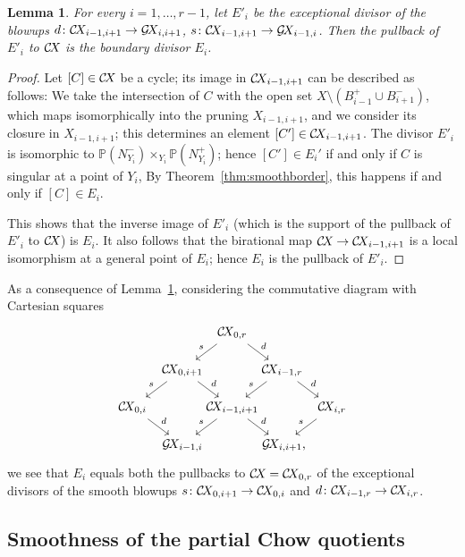 \documentclass[10pt,a4paper]{article}
\numberwithin{equation}{section}
\newtheorem{lemma}[theorem]{Lemma}
\theoremstyle{definition}
\theoremstyle{remark}
\def\P{{\mathbb P}}
\def\prul{s}
\def\prur{d}
\def\GX{\mathcal{G}\!X\hspace{-0.5pt}}
\def\CX{\mathcal{C}\!X\hspace{-0.5pt}}
\begin{document}
\begin{lemma}\label{lem:Eiblowup}
For every $i = 1, \dots, r-1$, let $E'_i$ be the exceptional divisor of the blowups
$\prur\colon\CX_{i-1,i+1}\to \GX_{i,i+1}$, $\prul\colon\CX_{i-1,i+1}\to \GX_{i-1,i}$. Then the pullback of $E'_i$ to $\CX$ is the boundary divisor $E_i$.
\end{lemma}

\begin{proof}
Let  $[C]\in \CX$ be a cycle; its image in $\CX_{i-1,i+1}$ can be described as follows:  We take the intersection of $C$ with the open set $X\setminus (B^+_{i-1}\cup B^-_{i+1})$, which maps isomorphically into the pruning $X_{i-1,i+1}$, and we consider its closure in $X_{i-1,i+1}$; this  determines an element $[C'] \in \CX_{i-1,i+1}$.  The divisor $E'_i$ is isomorphic to $\P(N_{Y_i}^-)\times_{Y_i}\P(N_{Y_i}^+)$; hence $[C'] \in E_i'$ if and only if $C$ is singular at a point of $Y_i$,  By Theorem~\ref{thm:smoothborder}, this happens if and only if $[C]\in E_i$. 

This shows that the inverse image of $E'_i$ (which is the support of the pullback of $E'_i$ to $\CX$) is $E_i$. It also follows that the birational map $\CX\to \CX_{i-1,i+1}$ is a local isomorphism at a general point of $E_i$; hence  $E_i$ is the pullback of $E'_i$.
\end{proof}

As a consequence of  Lemma~\ref{lem:Eiblowup}, considering the commutative diagram with Cartesian squares
\[
\begin{tikzcd}[
  column sep={4em,between origins},
  row sep={3em,between origins}]
&&\CX_{0,r}\arrow[rd,"\prur"] \arrow[dl,"\prul",labels=above left] &&\\
&\CX_{0,i+1}\arrow[rd,"\prur"] \arrow[dl,"\prul",labels=above left]&&\CX_{i-1,r}\arrow[rd,"\prur"] \arrow[dl,"\prul",labels=above left]&\\
\CX_{0,i}\arrow[rd,"\prur"]&&\CX_{i-1,i+1}\arrow[rd,"\prur"] \arrow[dl,"\prul",labels=above left]&&\CX_{i,r} \arrow[dl,"\prul",labels=above left]\\
&\GX_{i-1,i}&&\GX_{i,i+1}\rlap{,}&
\end{tikzcd}
\]
we see that $E_i$ equals both the pullbacks to $\CX=\CX_{0,r}$ of the exceptional divisors of the smooth blowups $\prul\colon \CX_{0,i+1}\to \CX_{0,i}$ and $\prur\colon \CX_{i-1,r}\to \CX_{i,r}$. 

\subsection{Smoothness of the partial Chow quotients}\label{ssec:smoothpart}
\end{document}

